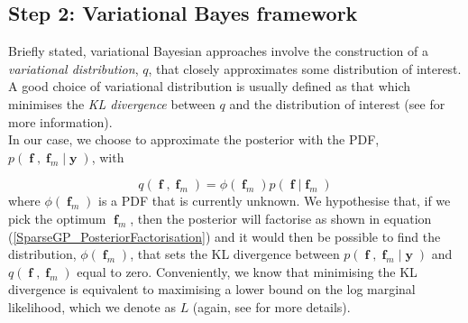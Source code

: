 \documentclass[a4paper, 11pt]{article}
\DeclareMathOperator{\y}{\boldsymbol{y}}
\DeclareMathOperator{\f}{\boldsymbol{f}}
\begin{document}
\begin{framed}
\subsection*{Step 2: Variational Bayes framework}
Briefly stated, variational Bayesian approaches involve the construction of a \emph{variational distribution}, $q$, that closely approximates some distribution of interest. A good choice of variational distribution is usually defined as that which minimises the \emph{KL divergence} between $q$ and the distribution of interest (see \cite{mackay2003information}\cite{Bishop2013} for more information). \\

In our case, we choose to approximate the posterior with the PDF, $p(\f,\f_m|\y)$, with 

\begin{equation}
	q(\f,\f_m) = \phi(\f_m)p(\f|\f_m)
\end{equation}
where $\phi(\f_m)$ is a PDF that is currently unknown. We hypothesise that, if we pick the optimum $\f_m$, then the posterior will factorise as shown in equation (\ref{SparseGP_PosteriorFactorisation}) and it would then be possible to find the distribution, $\phi(\f_m)$, that sets the KL divergence between $p(\f,\f_m|\y)$ and $q(\f,\f_m)$ equal to zero. Conveniently, we know that minimising the KL divergence is equivalent to maximising a lower bound on the log marginal likelihood, which we denote as $L$ (again, see \cite{mackay2003information}\cite{Bishop2013} for more details).
\end{framed}
\end{document}
